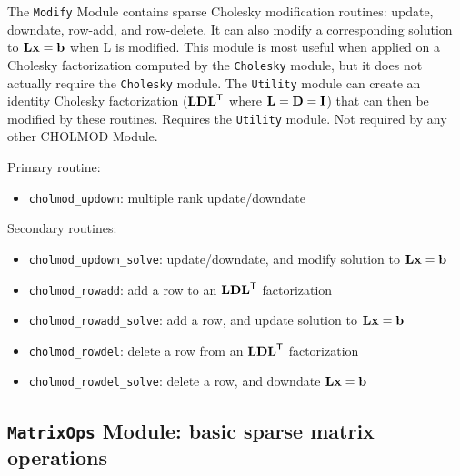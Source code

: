 \documentclass[11pt]{article}
\newcommand{\m}[1]{{\bf{#1}}}       %
\newcommand{\tr}{^{\sf T}}          %
\begin{document}
The {\tt Modify} Module contains sparse Cholesky modification routines: update,
downdate, row-add, and row-delete.  It can also modify a corresponding solution
to $\m{Lx}=\m{b}$ when L is modified.  This module is most useful when applied
on a Cholesky factorization computed by the {\tt Cholesky} module, but it does
not actually require the {\tt Cholesky} module.  The {\tt Utility} module can
create an identity Cholesky factorization ($\m{LDL}\tr$ where
$\m{L}=\m{D}=\m{I}$) that can then be modified by these routines.  Requires the
{\tt Utility} module.  Not required by any other CHOLMOD Module.

\vspace{0.1in}
\noindent Primary routine:

    \begin{itemize}
    \item {\tt cholmod\_updown}: multiple rank update/downdate
    \end{itemize}

\noindent Secondary routines:

    \begin{itemize}
    \item {\tt cholmod\_updown\_solve}: update/downdate, and modify solution to
    $\m{Lx=b}$
    \item {\tt cholmod\_rowadd}: add a row to an $\m{LDL}\tr$ factorization
    \item {\tt cholmod\_rowadd\_solve}: add a row, and update solution to
    $\m{Lx=b}$
    \item {\tt cholmod\_rowdel}: delete a row from an $\m{LDL}\tr$ factorization
    \item {\tt cholmod\_rowdel\_solve}: delete a row, and downdate $\m{Lx=b}$
    \end{itemize}

\subsection{{\tt MatrixOps} Module: basic sparse matrix operations}
\end{document}
